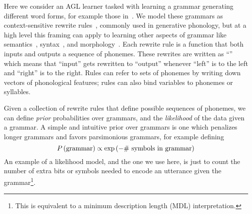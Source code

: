 \documentclass{article}
\begin{document}
Here we consider an AGL learner tasked with learning a grammar generating different word forms,
for example those in~\citep{marcus1999rule,gerken2010infants}.
We model these grammars as context-sensitive rewrite rules~\citep{chomsky1968sound},
commonly used in generative phonology,
but at a high level this framing can apply to
learning other aspects of grammar like semantics~\citep{piantadosi2011learning}, syntax~\citep{perfors2011learnability}, and morphology~\citep{tim}.
%
Each  rewrite rule is a function that both inputs and outputs a sequence of phonemes.
These rewrites are written as ``'' %
which means that ``input'' gets rewritten to ``output'' whenever ``left'' is to the left and ``right'' is to the right.
Rules can refer to sets of phonemes by writing down vectors of phonological features;
rules can also bind variables to phonemes or syllables.

Given a collection of rewrite rules that define possible sequences of phonemes, we can define \emph{prior} probabilities over grammars, and the \emph{likelihood} of the data given a grammar. 
A simple and intuitive prior over grammars is one which penalizes longer grammars and favors parsimonious grammars, for example defining
$$P\left(\text{grammar}  \right)\propto\exp\left(- \text{\# symbols in grammar} \right)$$
An example of a likelihood model,
and the one we use here,
is just to count the number of extra bits or symbols needed to encode an utterance given the grammar\footnote{This is equivalent to a minimum description length (MDL) interpretation.}.
\end{document}
